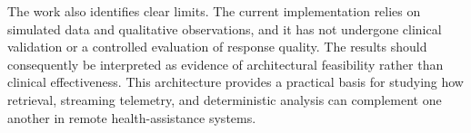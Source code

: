 \documentclass[runningheads]{llncs}
\begin{document}
The work also identifies clear limits. The current implementation relies on simulated data and qualitative observations, and it has not undergone clinical validation or a controlled evaluation of response quality. The results should consequently be interpreted as evidence of architectural feasibility rather than clinical effectiveness. This architecture provides a practical basis for studying how retrieval, streaming telemetry, and deterministic analysis can complement one another in remote health-assistance systems.
\end{document}
